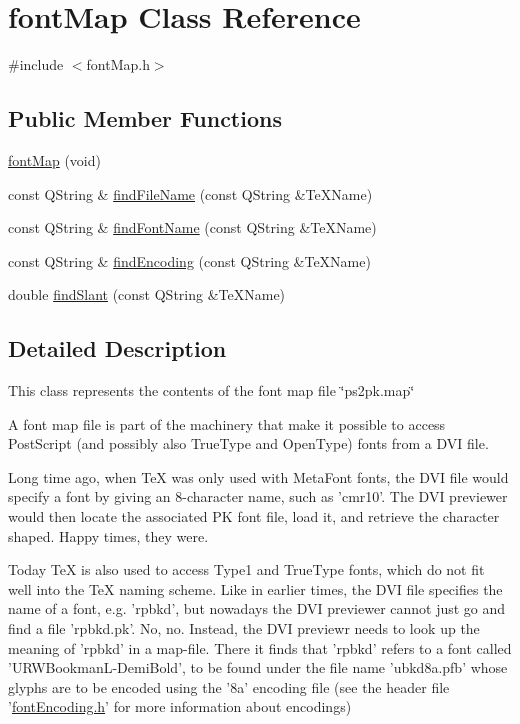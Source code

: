\hypertarget{classfontMap}{\section{font\+Map Class Reference}
\label{classfontMap}
}


{\ttfamily \#include $<$font\+Map.\+h$>$}

\subsection*{Public Member Functions}
\begin{DoxyCompactItemize}
\item 
\hyperlink{classfontMap_a679cb90290ba45d83dffd758132ec545}{font\+Map} (void)
\item 
const Q\+String \& \hyperlink{classfontMap_adaedae5df4d4eb4d9397b6ac03102c05}{find\+File\+Name} (const Q\+String \&Te\+X\+Name)
\item 
const Q\+String \& \hyperlink{classfontMap_adfba987e6e46bd9ca446f3faaa370f51}{find\+Font\+Name} (const Q\+String \&Te\+X\+Name)
\item 
const Q\+String \& \hyperlink{classfontMap_ae24a23fb4fcd13b3f722cff2d90624d6}{find\+Encoding} (const Q\+String \&Te\+X\+Name)
\item 
double \hyperlink{classfontMap_aff91edbddf9508896cd24f4873b5469f}{find\+Slant} (const Q\+String \&Te\+X\+Name)
\end{DoxyCompactItemize}


\subsection{Detailed Description}
This class represents the contents of the font map file \char`\"{}ps2pk.\+map\char`\"{}

A font map file is part of the machinery that make it possible to access Post\+Script (and possibly also True\+Type and Open\+Type) fonts from a D\+V\+I file.

Long time ago, when Te\+X was only used with Meta\+Font fonts, the D\+V\+I file would specify a font by giving an 8-\/character name, such as 'cmr10'. The D\+V\+I previewer would then locate the associated P\+K font file, load it, and retrieve the character shaped. Happy times, they were.

Today Te\+X is also used to access Type1 and True\+Type fonts, which do not fit well into the Te\+X naming scheme. Like in earlier times, the D\+V\+I file specifies the name of a font, e.\+g. 'rpbkd', but nowadays the D\+V\+I previewer cannot just go and find a file 'rpbkd.\+pk'. No, no. Instead, the D\+V\+I previewr needs to look up the meaning of 'rpbkd' in a map-\/file. There it finds that 'rpbkd' refers to a font called 'U\+R\+W\+Bookman\+L-\/\+Demi\+Bold', to be found under the file name 'ubkd8a.\+pfb' whose glyphs are to be encoded using the '8a' encoding file (see the header file '\hyperlink{fontEncoding_8h}{font\+Encoding.\+h}' for more information about encodings)

